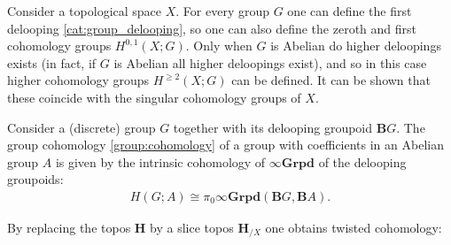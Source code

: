     \begin{example}
        Consider a topological space $X$. For every group $G$ one can define the first delooping \ref{cat:group_delooping}, so one can also define the zeroth and first cohomology groups $H^{0,1}(X;G)$. Only when $G$ is Abelian do higher deloopings exists (in fact, if $G$ is Abelian all higher deloopings exist), and so in this case higher cohomology groups $H^{\geq 2}(X;G)$ can be defined. It can be shown that these coincide with the singular cohomology groups of $X$.
    \end{example}
    \begin{example}
        Consider a (discrete) group $G$ together with its delooping groupoid $\mathbf{B}G$. The group cohomology \ref{group:cohomology} of a group with coefficients in an Abelian group $A$ is given by the intrinsic cohomology of $\infty\mathbf{Grpd}$ of the delooping groupoids:
        \begin{gather}
            H(G;A)\cong\pi_0\infty\mathbf{Grpd}(\mathbf{B}G,\mathbf{B}A).
        \end{gather}
    \end{example}

    By replacing the topos $\mathbf{H}$ by a slice topos $\mathbf{H}_{/X}$ one obtains twisted cohomology:
